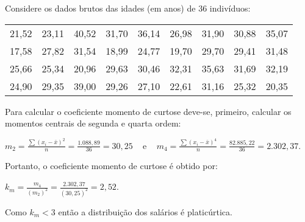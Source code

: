 \documentclass[11pt,fleqn]{book} %
\begin{document}
\begin{example} \label{exemp:curtose}

	Considere os dados brutos das idades (em anos) de 36 indivíduos:
	
	\begin{center}
	\begin{tabular}{c c c c c c c c c}
	\hline
	21,52 & 23,11 & 40,52 & 31,70 & 36,14 & 26,98 & 31,90 & 30,88 & 35,07 \\
	17,58 & 27,82 & 31,54 & 18,99 & 24,77 & 19,70 & 29,70 & 29,41 & 31,48 \\
	25,66 & 25,34 & 20,96 & 29,63 & 30,46 & 32,31 & 35,63 & 31,69 & 32,19 \\
	24,90 & 29,35 & 39,00 & 29,26 & 27,10 & 22,61 & 31,16 & 25,32 & 20,35 \\
	\hline
	\end{tabular}
	\end{center}
	
\vspace{0,3cm}
	
%	
	
	Para calcular o coeficiente momento de curtose deve-se, primeiro, calcular os momentos centrais de segunda e quarta ordem: \\
	
\begin{center}
$\displaystyle m_2=\frac{\sum (x_i-\bar{x})^2}{n}=\frac{1.088,89}{36}=30,25$ \,\,\, e \,\,\, $\displaystyle m_4=\frac{\sum (x_i-\bar{x})^4}{n}=\frac{82.885,22}{36}=2.302,37$. \\
\end{center}
	
\vspace{0,2cm}
	
Portanto, o coeficiente momento de curtose é obtido por: \\

\begin{center}
$\displaystyle k_m=\frac{m_4}{(m_2)^2}=\frac{2.302,37}{(30,25)^2}=2,52$. \\
\end{center}

\vspace{0,2cm}

Como $k_m<3$ então a distribuição dos salários é platicúrtica.\\	
		 
\end{example}
\end{document}
